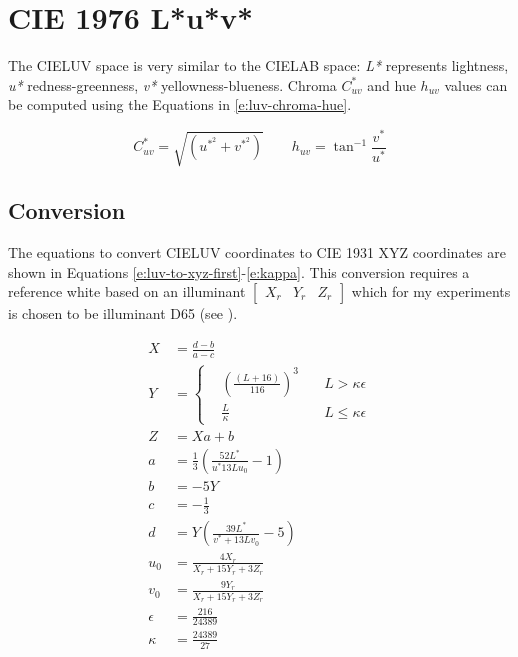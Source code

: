 \section{CIE 1976 L*u*v*}
\label{s:luv}

The CIELUV space is very similar to the CIELAB space: \emph{L*}
represents lightness, \emph{u*} redness-greenness, \emph{v*}
yellowness-blueness. Chroma $C^*_{uv}$ and hue $h_{uv}$ values can be
computed using the Equations in \ref{e:luv-chroma-hue}.

\begin{equation}
C^*_{uv} = \sqrt{\left(u^{*^2} + v^{*^2} \right)} \qquad h_{uv} = \tan^{-1} \frac{v^*}{u^*}
\label{e:luv-chroma-hue}
\end{equation}

\subsection{Conversion}

The equations to convert CIELUV coordinates to CIE 1931 XYZ
coordinates are shown in Equations
\ref{e:luv-to-xyz-first}-\ref{e:kappa}. This conversion requires a
reference white based on an illuminant $\begin{bmatrix}X_r & Y_r &
  Z_r\end{bmatrix}$ which for my experiments is chosen to be
illuminant D65 (see ).

\begin{align}
X& = \frac{d - b}{a - c} 
\label{e:luv-to-xyz-first} \\
Y& = 
\left\{
\begin{aligned}
&\left(\frac{(L + 16)}{116}\right)^3& \quad L > \kappa\epsilon \\
&\frac{L}{\kappa}& \quad L \leq \kappa\epsilon
\end{aligned} 
\right. \\
Z& = Xa + b \\
a& = \frac{1}{3}\left(\frac{52L^{*}}{u^{*}13Lu_0}-1\right) \\
b& = -5Y  \\
c& = -\frac{1}{3} \\
d& = Y \left(\frac{39L^{*}}{v^{*}+13Lv_0} - 5\right) \\
u_0& = \frac{4X_r}{X_r + 15Y_r + 3 Z_r}  \\
v_0& = \frac{9Y_r}{X_r + 15Y_r + 3 Z_r}  \\
\epsilon& = \frac{216}{24389} 
\label{e:epsilon} \\
\kappa& = \frac{24389}{27}
\label{e:kappa}
\end{align}

